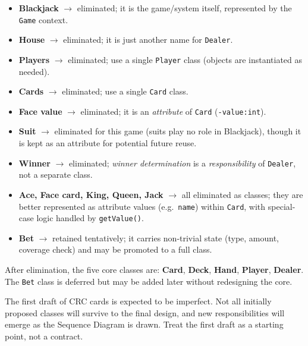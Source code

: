 \documentclass[11pt, a4paper, notitlepage]{report}
\theoremstyle{definition}
\theoremstyle{remark}
\theoremstyle{definition}
\begin{document}
\begin{itemize}
  \item \textbf{Blackjack} $\to$ eliminated; it is the game/system itself, represented
        by the \texttt{Game} context.
  \item \textbf{House} $\to$ eliminated; it is just another name for \texttt{Dealer}.
  \item \textbf{Players} $\to$ eliminated; use a single \texttt{Player} class (objects
        are instantiated as needed).
  \item \textbf{Cards} $\to$ eliminated; use a single \texttt{Card} class.
  \item \textbf{Face value} $\to$ eliminated; it is an \emph{attribute} of \texttt{Card}
        (\texttt{-value:int}).
  \item \textbf{Suit} $\to$ eliminated for this game (suits play no role in Blackjack),
        though it is kept as an attribute for potential future reuse.
  \item \textbf{Winner} $\to$ eliminated; \emph{winner determination} is a
        \emph{responsibility} of \texttt{Dealer}, not a separate class.
  \item \textbf{Ace, Face card, King, Queen, Jack} $\to$ all eliminated as classes;
        they are better represented as attribute values (e.g.\ \texttt{name}) within
        \texttt{Card}, with special-case logic handled by \texttt{getValue()}.
  \item \textbf{Bet} $\to$ retained tentatively; it carries non-trivial state (type,
        amount, coverage check) and may be promoted to a full class.
\end{itemize}

\begin{keyresult}[title={Key Result: Final Class List}]
After elimination, the five core classes are:
\textbf{Card}, \textbf{Deck}, \textbf{Hand}, \textbf{Player}, \textbf{Dealer}.
The \texttt{Bet} class is deferred but may be added later without redesigning the core.
\end{keyresult}

\begin{warning}[title={Warning: CRC Cards Will Change}]
The first draft of CRC cards is expected to be imperfect. Not all initially proposed
classes will survive to the final design, and new responsibilities will emerge as the
Sequence Diagram is drawn. Treat the first draft as a starting point, not a contract.
\end{warning}
\end{document}
